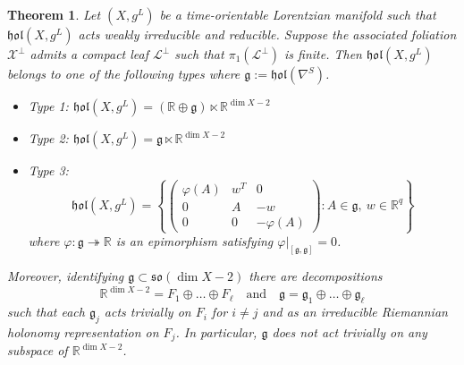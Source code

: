 \documentclass[a4paper,10pt,twoside]{amsart}
\newtheorem{theorem}{Theorem}[section]
\theoremstyle{definition}
\theoremstyle{remark}
\numberwithin{equation}{section}
\begin{document}
\begin{theorem}
	Let $(X,g^{L})$ be a time-orientable Lorentzian manifold such that ${\mathfrak{{hol}}}(X,g^{L})$ acts weakly irreducible and reducible. Suppose
	the associated foliation $\mathcal{X}^{\perp}$ admits a compact leaf $\mathcal{L}^{\perp}$ such that $\pi_{1}(\mathcal{L}^{\perp})$ is finite.
	Then ${\mathfrak{{hol}}}(X,g^{L})$ belongs to one of the following types where ${\mathfrak{{g}}}:={\mathfrak{{hol}}}(\nabla^{S})$.
	\begin{itemize}
		\item \noindent
		Type 1: ${\mathfrak{{hol}}}(X,g^{L}) = ({\mathbb{R}} \oplus {\mathfrak{{g}}}) \ltimes {\mathbb{R}}^{\dim X-2}$
		\item \noindent
		Type 2: ${\mathfrak{{hol}}}(X,g^{L}) = {\mathfrak{{g}}} \ltimes {\mathbb{R}}^{\dim X -2}$
		\item \noindent
		Type 3:
		\begin{equation*}
			{\mathfrak{{hol}}}(X,g^{L}) = \left\lbrace \begin{pmatrix}
							\varphi(A) & w^T & 0\\
							0 & A & -w\\
							0 & 0 & -\varphi(A)
						\end{pmatrix}: A \in {\mathfrak{{g}}},~w \in {\mathbb{R}}^{q} \right\rbrace
		\end{equation*}
		where $\varphi: {\mathfrak{{g}}} \twoheadrightarrow {\mathbb{R}}$ is an epimorphism satisfying
		$\varphi|_{[{\mathfrak{{g}}},{\mathfrak{{g}}}]}=0$.
	\end{itemize}
	Moreover, identifying ${\mathfrak{{g}}} \subset {\mathfrak{{so}}}(\dim X -2)$ there are decompositions
	\begin{equation*}
		{\mathbb{R}}^{\dim X -2} = F_{1} \oplus \ldots \oplus F_{\ell} \quad \text{and}
							\quad {\mathfrak{{g}}} = {\mathfrak{{g}}}_{1} \oplus \ldots \oplus {\mathfrak{{g}}}_{\ell}
	\end{equation*}
	such that each ${\mathfrak{{g}}}_{j}$ acts trivially on $F_{i}$ for $i \neq j$ and as an irreducible Riemannian holonomy representation on $F_{j}$.
	In particular, ${\mathfrak{{g}}}$ does not act trivially on any subspace of ${\mathbb{R}}^{\dim X -2}$.
\end{theorem}
\end{document}
